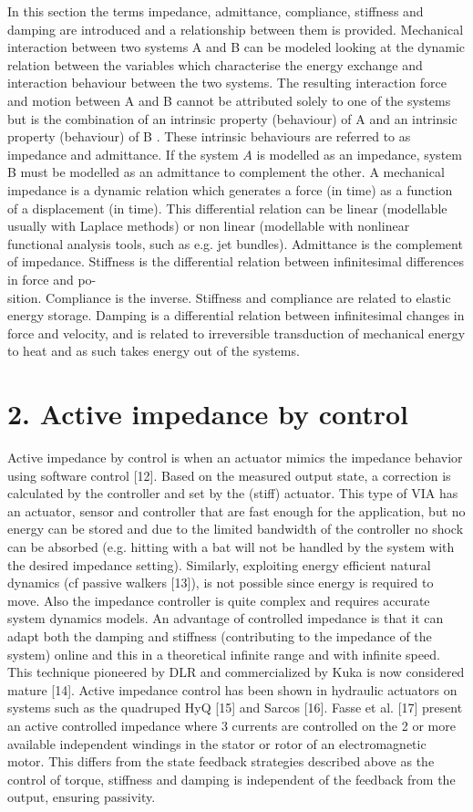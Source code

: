 \documentclass[10pt]{article}
\begin{document}
In this section the terms impedance, admittance, compliance, stiffness and damping are introduced and a relationship between them is provided. Mechanical interaction between two systems A and B can be modeled looking at the dynamic relation between the variables which characterise the energy exchange and interaction behaviour between the two systems. The resulting interaction force and motion between A and B cannot be attributed solely to one of the systems but is the combination of an intrinsic property (behaviour) of A and an intrinsic property (behaviour) of B . These intrinsic behaviours are referred to as impedance and admittance. If the system $A$ is modelled as an impedance, system B must be modelled as an admittance to complement the other. A mechanical impedance is a dynamic relation which generates a force (in time) as a function of a displacement (in time). This differential relation can be linear (modellable usually with Laplace methods) or non linear (modellable with nonlinear functional analysis tools, such as e.g. jet bundles). Admittance is the complement of impedance. Stiffness is the differential relation between infinitesimal differences in force and po-\\
sition. Compliance is the inverse. Stiffness and compliance are related to elastic energy storage. Damping is a differential relation between infinitesimal changes in force and velocity, and is related to irreversible transduction of mechanical energy to heat and as such takes energy out of the systems.

\section*{2. Active impedance by control}
Active impedance by control is when an actuator mimics the impedance behavior using software control [12]. Based on the measured output state, a correction is calculated by the controller and set by the (stiff) actuator. This type of VIA has an actuator, sensor and controller that are fast enough for the application, but no energy can be stored and due to the limited bandwidth of the controller no shock can be absorbed (e.g. hitting with a bat will not be handled by the system with the desired impedance setting). Similarly, exploiting energy efficient natural dynamics (cf passive walkers [13]), is not possible since energy is required to move. Also the impedance controller is quite complex and requires accurate system dynamics models. An advantage of controlled impedance is that it can adapt both the damping and stiffness (contributing to the impedance of the system) online and this in a theoretical infinite range and with infinite speed. This technique pioneered by DLR and commercialized by Kuka is now considered mature [14]. Active impedance control has been shown in hydraulic actuators on systems such as the quadruped HyQ [15] and Sarcos [16]. Fasse et al. [17] present an active controlled impedance where 3 currents are controlled on the 2 or more available independent windings in the stator or rotor of an electromagnetic motor. This differs from the state feedback strategies described above as the control of torque, stiffness and damping is independent of the feedback from the output, ensuring passivity.
\end{document}
